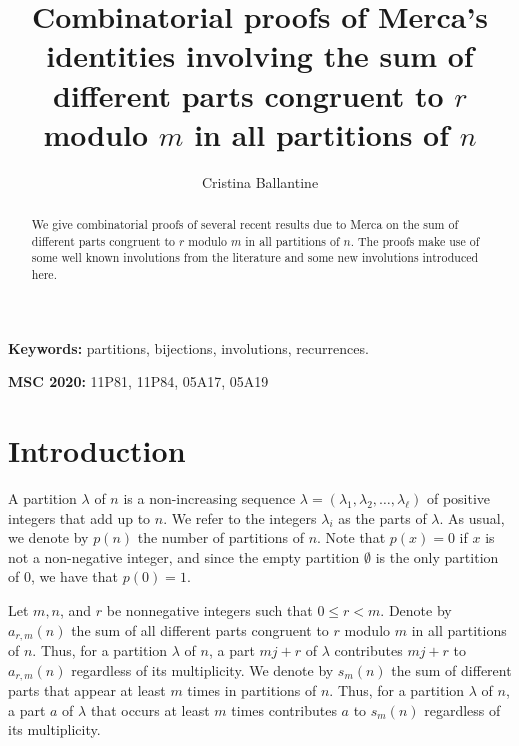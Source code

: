 \documentclass{amsart}
\theoremstyle{definition}
\begin{document}
\title[Combinatorial proofs of Merca's  theorems]{Combinatorial proofs of Merca's identities involving the sum of different parts congruent to $r$ modulo $m$ in all partitions of $n$}
\author{Cristina Ballantine}\address{Department of Mathematics and Computer Science\\ College of the Holy Cross \\ Worcester, MA 01610, USA \\} 



\maketitle

\begin{abstract} We give combinatorial proofs of several recent results due to Merca on the sum of different parts congruent to $r$ modulo $m$ in all partitions of $n$. The proofs make use of some well known involutions from the literature and some new involutions introduced here. 
\end{abstract}



{\bf Keywords:} partitions, bijections, involutions, recurrences.

{\bf MSC 2020:} 11P81, 11P84, 05A17, 05A19

\section{Introduction}

A partition $\lambda$ of $n$ is a non-increasing sequence $\lambda= (\lambda_1, \lambda_2, \ldots, \lambda_\ell)$ of positive integers that add up to $n$. We refer to the integers $\lambda_i$ as the parts of $\lambda$.  As usual, we denote by $p(n)$  the number of  partitions of $n$. Note that $p(x)=0$ if $x$ is not a non-negative integer, and since the empty partition $\emptyset$ is the only partition of $0$, we have that $p(0)=1$. 



Let $m,n$, and $r$ be nonnegative integers such that $0\leq r<m$. Denote by $a_{r,m}(n)$ the sum of all different parts congruent to $r$ modulo $m$ in all partitions of $n$. Thus, for a partition $\lambda$ of $n$, a part $mj+r$ of $\lambda$ contributes $mj+r$ to $a_{r,m}(n)$ regardless of its multiplicity.  We denote by $s_m(n)$ the sum of different parts that appear at least $m$ times in partitions of $n$.  Thus, for a partition $\lambda$ of $n$, a part $a$ of $\lambda$  that occurs at least $m$ times contributes $a$ to $s_m(n)$ regardless of its multiplicity.
\end{document}
